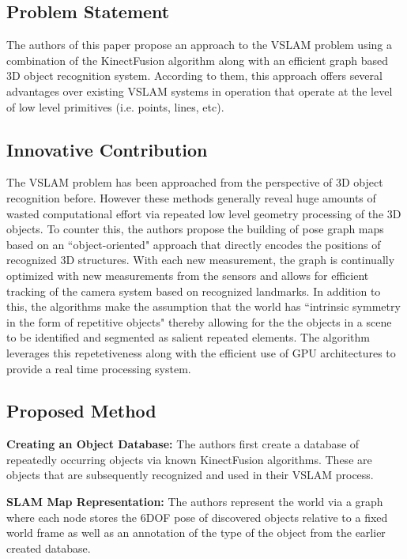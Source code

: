 \documentclass[10pt,twocolumn,letterpaper]{article}
\begin{document}
\subsection{Problem Statement}
The authors of this paper propose an approach to the VSLAM problem using a combination of the KinectFusion algorithm along with an efficient graph based 3D object recognition system. According to them, this approach offers several advantages over existing VSLAM systems in operation that operate at the level of low level primitives (i.e. points, lines, etc). 

\subsection{Innovative Contribution}
The VSLAM problem has been approached from the perspective of 3D object recognition before. However these methods generally reveal  huge amounts of wasted computational effort via repeated low level geometry processing of the 3D objects. To counter this, the authors propose the building of pose graph maps based on an ``object-oriented" approach that directly encodes the positions of recognized 3D structures. With each new measurement, the graph is continually optimized with new measurements from the sensors and allows for efficient tracking of the camera system based on recognized landmarks. In addition to this, the algorithms make the assumption that the world has ``intrinsic symmetry in the form of repetitive objects" thereby allowing for the the objects in a scene to be identified and segmented as salient repeated elements. The algorithm leverages this repetetiveness along with the efficient use of GPU architectures to provide a real time processing system. 

\subsection{Proposed Method}
\textbf{Creating an Object Database:} The authors first create a database of repeatedly occurring objects via known KinectFusion algorithms. These are objects that are subsequently recognized and used in their VSLAM process. 

\textbf{SLAM Map Representation:} The authors represent the world via a graph where each node stores the 6DOF pose of discovered objects relative to a fixed world frame as well as an annotation of the type of the object from the earlier created database. 
\end{document}
